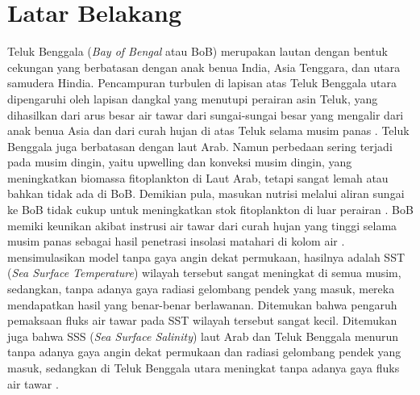 \vspace{1.5pc}
\section[Latar Belakang]{Latar Belakang}
\begin{spacing}{1.5}
	Teluk Benggala (\textit{Bay of Bengal} atau BoB) merupakan lautan dengan bentuk cekungan yang berbatasan dengan anak benua India, Asia Tenggara, dan utara samudera Hindia. Pencampuran turbulen di lapisan atas Teluk Benggala utara dipengaruhi oleh lapisan dangkal yang menutupi perairan asin Teluk, yang dihasilkan dari arus besar air tawar dari sungai-sungai besar yang mengalir dari anak benua Asia dan dari curah hujan di atas Teluk selama musim panas . Teluk Benggala juga berbatasan dengan laut Arab. Namun perbedaan sering terjadi pada musim dingin, yaitu upwelling dan konveksi musim dingin, yang meningkatkan biomassa fitoplankton di Laut Arab, tetapi sangat lemah atau bahkan tidak ada di BoB. Demikian pula, masukan nutrisi melalui aliran sungai ke BoB tidak cukup untuk meningkatkan stok fitoplankton di luar perairan . BoB memiki keunikan akibat instrusi air tawar dari curah hujan yang tinggi selama musim panas sebagai hasil penetrasi insolasi matahari di kolom air \cite{Kantha2019}.  mensimulasikan model tanpa gaya angin dekat permukaan, hasilnya adalah SST (\textit{Sea Surface Temperature}) wilayah tersebut sangat meningkat di semua musim, sedangkan, tanpa adanya gaya radiasi gelombang pendek yang masuk, mereka mendapatkan hasil yang benar-benar berlawanan. Ditemukan bahwa pengaruh pemaksaan fluks air tawar pada SST wilayah tersebut sangat kecil. Ditemukan juga bahwa SSS (\textit{Sea Surface Salinity}) laut Arab dan Teluk Benggala menurun tanpa adanya gaya angin dekat permukaan dan radiasi gelombang pendek yang masuk, sedangkan di Teluk Benggala utara meningkat tanpa adanya gaya fluks air tawar .
	

\end{spacing}
